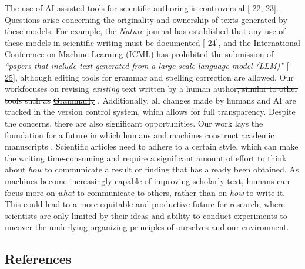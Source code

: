 \documentclass[
]{article}
\providecommand{\DIFaddtex}[1]{{\protect\color{blue}\uwave{#1}}} %
\providecommand{\DIFdeltex}[1]{{\protect\color{red}\sout{#1}}}                      %
\providecommand{\DIFaddbegin}{} %
\providecommand{\DIFaddend}{} %
\providecommand{\DIFdelbegin}{} %
\providecommand{\DIFdelend}{} %
\providecommand{\DIFadd}[1]{\texorpdfstring{\DIFaddtex{#1}}{#1}} %
\providecommand{\DIFdel}[1]{\texorpdfstring{\DIFdeltex{#1}}{}} %
\newcommand{\DIFscaledelfig}{0.5}
\newlength{\DIFdelgraphicswidth} %
\newlength{\DIFdelgraphicsheight} %
\newcommand{\DIFaddincludegraphics}[2][]{{\color{blue}\fbox{\DIFOincludegraphics[#1]{#2}}}} %
\newcommand{\DIFdelincludegraphics}[2][]{%
\sbox{\DIFdelgraphicsbox}{\DIFOincludegraphics[#1]{#2}}%
\settoboxwidth{\DIFdelgraphicswidth}{\DIFdelgraphicsbox} %
\settoboxtotalheight{\DIFdelgraphicsheight}{\DIFdelgraphicsbox} %
\scalebox{\DIFscaledelfig}{%
\parbox[b]{\DIFdelgraphicswidth}{\usebox{\DIFdelgraphicsbox}\\[-\baselineskip] \rule{\DIFdelgraphicswidth}{0em}}\llap{\resizebox{\DIFdelgraphicswidth}{\DIFdelgraphicsheight}{%
\setlength{\unitlength}{\DIFdelgraphicswidth}%
\begin{picture}(1,1)%
\thicklines\linethickness{2pt} %
{\color[rgb]{1,0,0}\put(0,0){\framebox(1,1){}}}%
{\color[rgb]{1,0,0}\put(0,0){\line( 1,1){1}}}%
{\color[rgb]{1,0,0}\put(0,1){\line(1,-1){1}}}%
\end{picture}%
}\hspace*{3pt}}} %
} %
\DeclareRobustCommand{\DIFaddbegin}{\DIFOaddbegin \let\includegraphics\DIFaddincludegraphics} %
\DeclareRobustCommand{\DIFaddend}{\DIFOaddend \let\includegraphics\DIFOincludegraphics} %
\DeclareRobustCommand{\DIFdelbegin}{\DIFOdelbegin \let\includegraphics\DIFdelincludegraphics} %
\DeclareRobustCommand{\DIFdelend}{\DIFOaddend \let\includegraphics\DIFOincludegraphics} %
\begin{document}
The use of AI-assisted tools for scientific authoring is controversial {[}\protect\DIFdelbegin %
\DIFdelend \DIFaddbegin \hyperlink{ref-1EAonKBXJ}{22}\DIFaddend ,\protect\DIFdelbegin %
\DIFdelend \DIFaddbegin \hyperlink{ref-KJTJqmxc}{23}{]}\DIFaddend .
Questions arise concerning the originality and ownership of texts generated by these models.
For example, the \emph{Nature} journal has established that any use of these models in scientific writing must be documented {[}\protect\DIFdelbegin %
\DIFdelend \DIFaddbegin \hyperlink{ref-wQLVc4o7}{24}{]}\DIFaddend , and the International Conference on Machine Learning (ICML) has prohibited the submission of \emph{``papers that include text generated from a large-scale language model (LLM)''} {[}\protect\DIFdelbegin %
\DIFdelend \DIFaddbegin \hyperlink{ref-K58CKD6D}{25}{]}\DIFaddend , although editing tools for grammar and spelling correction are allowed.
Our work\DIFaddbegin \DIFadd{, however, }\DIFaddend focuses on revising \emph{existing} text written by a human author\DIFdelbegin \DIFdel{, similar to other tools such as }\href{https://www.grammarly.com}{\DIFdel{Grammarly}}%
\DIFdelend .
Additionally, all changes made by humans and AI are tracked in the version control system, which allows for full transparency.
Despite the concerns, there are also significant opportunities.
Our work lays the foundation for a future in which humans and machines construct academic manuscripts \DIFaddbegin \DIFadd{together}\DIFaddend .
Scientific articles need to adhere to a certain style, which can make the writing time-consuming and require a significant amount of effort to think about \emph{how} to communicate a result or finding that has already been obtained.
As machines become increasingly capable of improving scholarly text, humans can focus more on \emph{what} to communicate to others, rather than on \emph{how} to write it.
This could lead to a more equitable and productive future for research, where scientists are only limited by their ideas and ability to conduct experiments to uncover the underlying organizing principles of ourselves and our environment.

\hypertarget{references}{%
\subsection{References}\label{references}}
\end{document}

